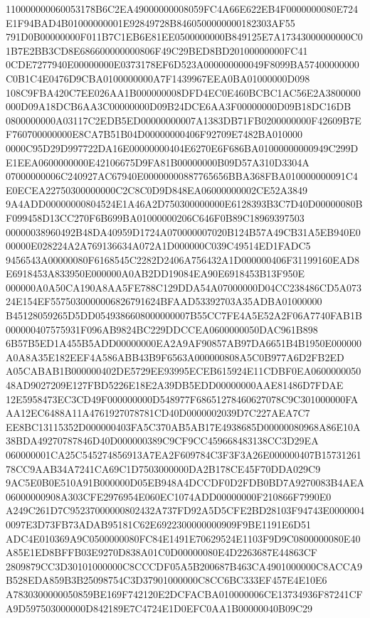 \documentclass[UTF8,fontset=fandol,zihao=-4,a4paper]{ctexart}
\begin{document}
{{110000000060053178B6C2EA49000000008059FC4A66E622EB4F0000000080E724E1F94BAD4B01000000001E92849728B8460500000000182303AF55
791D0B00000000F011B7C1EB6E81EE0500000000B849125E7A17343000000000C01B7E2BB3CD8E686600000000806F49C29BED8BD20100000000FC41
0CDE7277940E00000000E0373178EF6D523A000000000049F8099BA57400000000C0B1C4E0476D9CBA0100000000A7F1439967EEA0BA01000000D098
108C9FBA420C7EE026AA1B000000008DFD4EC0E460BCBC1AC56E2A3800000000D09A18DCB6AA3C00000000D09B24DCE6AA3F00000000D09B18DC16DB
0800000000A03117C2EDB5ED00000000007A1383DB71FB0200000000F42609B7EF760700000000E8CA7B51B04D00000000406F92709E7482BA010000
0000C95D29D997722DA16E00000000404E6270E6F686BA01000000000949C299DE1EEA0600000000E42106675D9FA81B00000000B09D57A310D3304A
07000000006C240927AC67940E00000000887765656BBA368FBA010000000091C4E0ECEA22750300000000C2C8C0D9D848EA06000000002CE52A3849
9A4ADD00000000804524E1A46A2D750300000000E6128393B3C7D40D00000080BF099458D13CC270F6B699BA01000000206C646F0B89C18969397503
00000038960492B48DA40959D1724A070000007020B124B57A49CB31A5EB940E000000E028224A2A769136634A072A1D000000C039C49514ED1FADC5
9456543A00000080F6168545C2282D2406A756432A1D000000406F31199160EAD8E6918453A833950E000000A0AB2DD19084EA90E6918453B13F950E
000000A0A50CA190A8AA5FE788C129DDA54A07000000D04CC238486CD5A07324E154EF5575030000006826791624BFAAD53392703A35ADBA01000000
B45128059265D5DD0549386608000000007B55CC7FE4A5E52A2F06A7740FAB1B000000407575931F096AB9824BC229DDCCEA0600000050DAC961B898
6B57B5ED1A455B5ADD00000000EA2A9AF90857AB97DA6651B4B1950E000000A0A8A35E182EEF4A586ABB43B9F6563A000000808A5C0B977A6D2FB2ED
A05CABAB1B000000402DE5729EE93995ECEB615924E11CDBF0EA060000005048AD9027209E127FBD5226E18E2A39DB5EDD00000000AAE81486D7FDAE
12E5958473EC3CD49F000000000D548977F68651278460627078C9C301000000FAAA12EC6488A11A4761927078781CD40D0000002039D7C227AEA7C7
EE8BC13115352D000000403FA5C370AB5AB17E4938685D00000080968A86E10A38BDA49270787846D40D000000389C9CF9CC459668483138CC3D29EA
060000001CA25C545274856913A7EA2F609784C3F3F3A26E000000407B1573126178CC9AAB34A7241CA69C1D7503000000DA2B178CE45F70DDA029C9
9AC5E0B0E510A91B000000D05EB948A4DCCDF0D2FDB0BD7A9270083B4AEA06000000908A303CFE2976954E060EC1074ADD00000000F210866F7990E0
A249C261D7C95237000000802432A737FD92A5D5CFE2BD28103F94743E00000040097E3D73FB73ADAB95181C62E6922300000000909F9BE1191E6D51
ADC4E010369A9C0500000080FC84E1491E70629524E1103F9D9C0800000080E40A85E1ED8BFFB03E9270D838A01C0D00000080E4D2263687E44863CF
2809879CC3D30101000000C8CCCDF05A5B200687B463CA4901000000C8ACCA9B528EDA859B3B25098754C3D37901000000C8CC6BC333EF457E4E10E6
A7830300000050859BE169F742120E2DCFACBA010000006CE13734936F87241CFA9D597503000000D842189E7C4724E1D0EFC0AA1B00000040B09C29
}}
\end{document}
